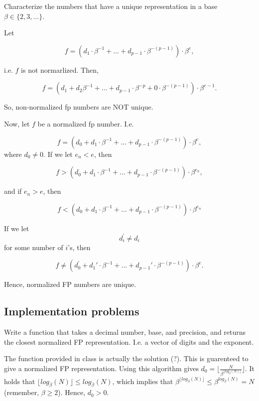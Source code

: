 \documentclass[]{book}
\theoremstyle{definition}
\theoremstyle{definition}
\theoremstyle{definition}
\theoremstyle{remark}
\let\BeginKnitrBlock\begin \let\EndKnitrBlock\end
\begin{document}
\BeginKnitrBlock{exercise}
\protect\hypertarget{exr:q103}{}{\label{exr:q103} }Characterize the numbers
that have a unique representation in a base \(\beta \in \{2,3,...\}\).
\EndKnitrBlock{exercise}

\BeginKnitrBlock{solution}
\iffalse{} {Solution. } \fi{}Let

\[f = \left(d_1\cdot\beta^{-1} + \ldots + d_{p-1}\cdot\beta^{-(p-1)}\right)\cdot\beta^{e},\]

i.e. \(f\) is not normarlized. Then,

\[
f = \left(d_1+d_2\beta^{-1} + \ldots + d_{p-1}\cdot\beta^{-p} + 0\cdot \beta^{-(p-1)}\right)\cdot\beta^{e-1}.
\]

So, non-normalized fp numbers are NOT unique.

Now, let \(f\) be a normalized fp number. I.e.

\[
f = \left(d_0 + d_1\cdot\beta^{-1} + \ldots + d_{p-1}\cdot\beta^{-(p-1)} \right)\cdot\beta^e,
\] where \(d_0 \neq 0\). If we let \(e_n < e\), then

\[
f > \left(d_0 + d_1\cdot\beta^{-1} + \ldots + d_{p-1}\cdot\beta^{-(p-1)} \right)\cdot\beta^{e_n},
\]

and if \(e_n > e\), then

\[
f < \left(d_0 + d_1\cdot\beta^{-1} + \ldots + d_{p-1}\cdot\beta^{-(p-1)} \right)\cdot\beta^{e_n}
\]

If we let \[d_i^\prime \neq d_i\] for some number of \(i\)'s, then

\[
f \neq \left(d_0^\prime + d_1\prime\cdot\beta^{-1} + \ldots + d_{p-1}\prime\cdot\beta^{-(p-1)} \right)\cdot\beta^e.
\]

Hence, normalized FP numbers are unique.
\EndKnitrBlock{solution}

\subsection{Implementation problems}\label{implementation-problems}

\BeginKnitrBlock{exercise}
\protect\hypertarget{exr:q104}{}{\label{exr:q104} }Write a function that
takes a decimal number, base, and precision, and returns the closest
normalized FP representation. I.e. a vector of digits and the exponent.
\EndKnitrBlock{exercise}

\BeginKnitrBlock{solution}
\iffalse{} {Solution. } \fi{}The function provided in class is actually
the solution (?). This is guarenteed to give a normalized FP
representation. Using this algorithm gives
\(d_0 = \lfloor \frac{N}{\beta^{\lfloor log_{\beta}\left(N\right) \rfloor}}\rfloor\).
It holds that
\(\lfloor log_{\beta}\left(N\right) \rfloor \le log_\beta\left(N\right)\),
which implies that
\(\beta^{\lfloor log_{\beta}\left(N\right) \rfloor} \le \beta^{log_\beta\left(N\right)} = N\)
(remember, \(\beta \geq 2\)). Hence, \(d_0 > 0\).
\EndKnitrBlock{solution}
\end{document}
